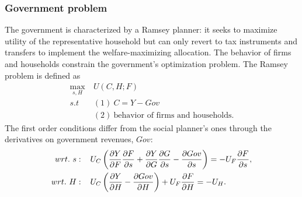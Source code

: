 \subsubsection{Government problem}\label{subsec:Rams}
The government is characterized by a Ramsey planner: it seeks to maximize utility of the representative household but can only revert to tax instruments and transfers to implement the welfare-maximizing allocation. The behavior of firms and households constrain the government's optimization problem. 
The Ramsey problem is defined as
\begin{align}
\underset{s, H}{\max}\ & U(C,H; F)\\ s.t\ \ & (1)\  C=Y-Gov\\ & (2) \ \text{behavior of firms and households}.
\end{align}
The first order conditions differ from the social planner's ones through the derivatives on government revenues, $Gov$:
\begin{align}
wrt.\ s:\hspace{4mm} & U_C\left(\frac{\partial Y}{\partial F}\frac{\partial F}{\partial s}+\frac{\partial Y}{\partial G}\frac{\partial G}{\partial s}-\frac{\partial Gov}{ \partial s}\right)=-U_F\frac{\partial F}{\partial s}, \label{eq:sbs}
\\
wrt.\ H:\hspace{4mm} & U_C\left(\frac{\partial Y}{\partial H}-\frac{\partial Gov}{\partial H}\right)+U_F\frac{\partial F}{\partial H}=-U_H\label{eq:sbh}. 
\end{align}


